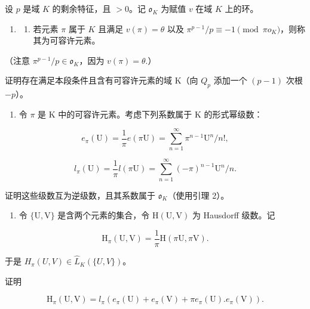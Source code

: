 
设 \(p\) 是域 \(K\) 的剩余特征，且 \(>0\)。记 \(\mathfrak{o}_{K}\) 为赋值 \(v\) 在域 \(K\) 上的环。

\begin{enumerate}
\def\labelenumi{\arabic{enumi}.}
\tightlist
\item
  \begin{enumerate}
  \def\labelenumii{(\alph{enumii})}
  \tightlist
  \item
    若元素 \(\pi\) 属于 \(K\) 且满足 \(v(\pi) = \theta\) 以及 \(\pi^{p-1} / p \equiv -1 \pmod{\pi o_K}\)，则称其为可容许元素。
  \end{enumerate}
\end{enumerate}

（注意 \(\pi^{p-1}/p\in\mathfrak{o}_{K}\)，因为 \(v(\pi)=\theta.\)）

证明存在满足本段条件且含有可容许元素的域 K（向 \(Q_{p}\) 添加一个 \((p - 1)\) 次根 \(-p\)）。

\begin{enumerate}
\def\labelenumi{(\alph{enumi})}
\setcounter{enumi}{1}
\tightlist
\item
  令 \(\pi\) 是 K 中的可容许元素。考虑下列系数属于 K 的形式幂级数：
\end{enumerate}

\[
e _ {\pi} (\mathrm{U}) = \frac {1}{\pi} e (\pi \mathrm{U}) = \sum_ {n = 1} ^ {\infty} \pi^ {n - 1} \mathrm{U} ^ {n} / n!,
\]

\[
l _ {\pi} (\mathrm{U}) = \frac {1}{\pi} l (\pi \mathrm{U}) = \sum_ {n = 1} ^ {\infty} (- \pi) ^ {n - 1} \mathrm{U} ^ {n} / n.
\]

证明这些级数互为逆级数，且其系数属于 \(\mathfrak{o}_{K}\)（使用引理 2）。

\begin{enumerate}
\def\labelenumi{(\alph{enumi})}
\setcounter{enumi}{2}
\tightlist
\item
  令 \(\{\mathrm{U},\mathrm{V}\}\) 是含两个元素的集合，令 \(\mathrm{H}(\mathrm{U},\mathrm{V})\) 为 Hausdorff 级数。记
\end{enumerate}

\[
\mathrm{H} _ {\pi} (\mathrm{U}, \mathrm{V}) = \frac {1}{\pi} \mathrm{H} (\pi \mathrm{U}, \pi \mathrm{V}).
\]

于是 \(H_{\pi}(U, V) \in \hat{L}_{K}(\{U, V\})\)。

证明

\[
\mathrm{H} _ {\pi} (\mathrm{U}, \mathrm{V}) = l _ {\pi} (e _ {\pi} (\mathrm{U}) + e _ {\pi} (\mathrm{V}) + \pi e _ {\pi} (\mathrm{U}). e _ {\pi} (\mathrm{V})).
\]

